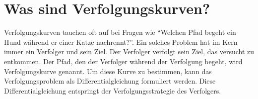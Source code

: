 %
%
%
\section{Was sind Verfolgungskurven?
\label{lambertw:section:Was_sind_Verfolgungskurven}}
%
Verfolgungskurven tauchen oft auf bei Fragen wie ``Welchen Pfad begeht ein Hund während er einer Katze nachrennt?''.
Ein solches Problem hat im Kern immer ein Verfolger und sein Ziel.
Der Verfolger verfolgt sein Ziel, das versucht zu entkommen.
Der Pfad, den der Verfolger während der Verfolgung begeht, wird Verfolgungskurve genannt.
Um diese Kurve zu bestimmen, kann das Verfolgungsproblem als Differentialgleichung formuliert werden.
Diese Differentialgleichung entspringt der Verfolgungsstrategie des Verfolgers.
%
